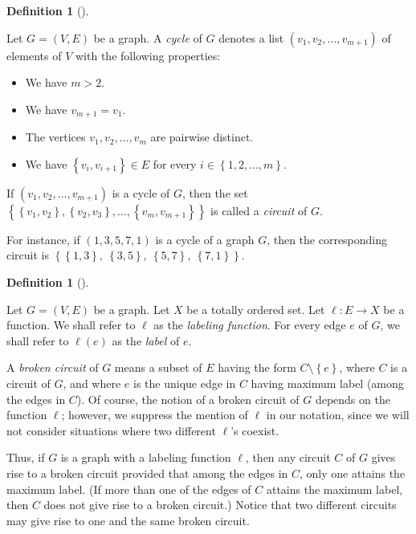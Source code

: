 \documentclass[numbers=enddot,12pt,final,onecolumn,notitlepage]{scrartcl}%
\theoremstyle{definition}
\newtheorem{defi}[theo]{Definition}
\newenvironment{definition}[1][]
{\begin{defi}[#1]\begin{leftbar}}
{\end{leftbar}\end{defi}}
\begin{document}
\begin{definition}
\label{def.cycle}Let $G=\left(  V,E\right)  $ be a graph. A \emph{cycle} of
$G$ denotes a list $\left(  v_{1},v_{2},\ldots,v_{m+1}\right)  $ of elements
of $V$ with the following properties:

\begin{itemize}
\item We have $m>2$.

\item We have $v_{m+1}=v_{1}$.

\item The vertices $v_{1},v_{2},\ldots,v_{m}$ are pairwise distinct.

\item We have $\left\{  v_{i},v_{i+1}\right\}  \in E$ for every $i\in\left\{
1,2,\ldots,m\right\}  $.
\end{itemize}

If $\left(  v_{1},v_{2},\ldots,v_{m+1}\right)  $ is a cycle of $G$, then the
set $\left\{  \left\{  v_{1},v_{2}\right\}  ,\left\{  v_{2},v_{3}\right\}
,\ldots,\left\{  v_{m},v_{m+1}\right\}  \right\}  $ is called a \emph{circuit}
of $G$.
\end{definition}

For instance, if $\left(  1,3,5,7,1\right)  $ is a cycle of a graph $G$, then
the corresponding circuit is $\left\{  \left\{  1,3\right\}  ,\ \left\{
3,5\right\}  ,\ \left\{  5,7\right\}  ,\ \left\{  7,1\right\}  \right\}  $.

\begin{definition}
\label{def.BC}Let $G=\left(  V,E\right)  $ be a graph. Let $X$ be a totally
ordered set. Let $\ell:E\rightarrow X$ be a function. We shall refer to $\ell$
as the \emph{labeling function}. For every edge $e$ of $G$, we shall refer to
$\ell\left(  e\right)  $ as the \emph{label} of $e$.

A \emph{broken circuit} of $G$ means a subset of $E$ having the form
$C\setminus\left\{  e\right\}  $, where $C$ is a circuit of $G$, and where $e$
is the unique edge in $C$ having maximum label (among the edges in $C$). Of
course, the notion of a broken circuit of $G$ depends on the function $\ell$;
however, we suppress the mention of $\ell$ in our notation, since we will not
consider situations where two different $\ell$'s coexist.
\end{definition}

Thus, if $G$ is a graph with a labeling function $\ell$, then any circuit $C$
of $G$ gives rise to a broken circuit provided that among the edges in $C$,
only one attains the maximum label. (If more than one of the edges of $C$
attains the maximum label, then $C$ does not give rise to a broken circuit.)
Notice that two different circuits may give rise to one and the same broken circuit.
\end{document}
